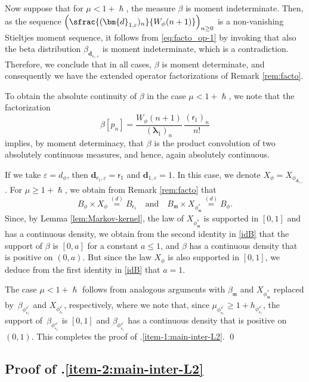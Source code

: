 \documentclass[10pt]{amsart}
\let\epsilon\varepsilon
\theoremstyle{plain}
\theoremstyle{definition}
\newcommand{\m}{\mathfrak{m}}
\newcommand{\dpt}{\bm{d}_{\vat,\epsilon}}
\newcommand{\dz}{{\bm{d}}_{1,\epsilon}}
\newcommand{\lam}{{\bm{\lambda}_1}}
\newcommand{\vat}{{\mathsf{r}_1}}
\newcommand{\phm}{{\phi_\m^*}}
\renewcommand{\varphi}{{\phi_{\vat}^{\checkmark}}}
\newcommand{\gab}[1][\lam,\mo]{{\beta_{#1}}}
\let\h\hslash
\let\mo\mu
\let\bpsi\beta
\begin{document}
Now suppose that for $\mo < 1+\h$, the measure $\bpsi$ is moment indeterminate. Then, as the sequence $\left(\sfrac{(\dz)_n}{W_{\phi}(n+1)}\right)_{n \geq 0}$ is a non-vanishing Stieltjes moment sequence, it follows from \eqref{eq:facto_op-1} by invoking \cite[Lem.\,2.2]{Berg} that also the beta distribution $\gab[\dpt]$ is moment indeterminate, which is a contradiction. Therefore, we conclude that in all cases, $\bpsi$ is moment determinate, and consequently we have the extended operator factorizations of Remark \ref{rem:facto}.

To obtain the absolute continuity of $\bpsi$ in the case $\mo < 1+\h$, we note that the factorization\vspace*{-3pt}
\[
\bpsi [p_n] = \frac{W_{\phi}(n+1)}{(\lam)_n}\,\frac{(\vat)_n}{n!}
\]
implies, by moment determinacy, that $\bpsi$ is the product convolution of two absolutely continuous measures, and hence, again absolutely continuous.

If we take $\epsilon = d_\phi$, then $\dpt = \vat$ and $\dz = 1$. In this case, we denote
$X_{\phi} = X_{\phi_{\dz}}$. For $\mo \ge 1 + \h$, we obtain from Remark \ref{rem:facto} that\vspace*{-3pt}
\begin{equation} \label{idB}
B_\phi \times X_{\phi} \stackrel{(d)}{=} B_{\vat} \quad \mbox{and} \quad
B_{\m} \times X_{\phi^*_{\m}} \stackrel{(d)}{=} B_{\phi}.
\end{equation}
Since, by Lemma \ref{lem:Markov-kernel}, the law of $X_{\phi^*_{\m}}$ is supported in $[0,1]$
and has a continuous density, we obtain from the second identity in \eqref{idB} that
the support of $\beta$ is $[0,a]$ for a constant $a \le 1$, and $\beta$ has a continuous
density that is positive on $(0,a)$. But since the law $X_{\phi}$ is also supported in $[0,1]$,
we deduce from the first identity in \eqref{idB} that $a = 1$.

The case $\mo < 1+\h$ follows from analogous arguments with $\gab[\m]$ and $X_{\phm}$ replaced by~$\bpsi_\varphi$ and $X_\varphi$, respectively, where we note that, since $\mo_\varphi \geq 1+h_\varphi$, the support of~$\bpsi_\varphi$ is $[0,1]$ and $\bpsi_\varphi$ has a continuous density that is positive on $(0,1)$. This completes the proof of .\eqref{item-1:main-inter-L2}. \qed

\subsection{Proof of .\eqref{item-2:main-inter-L2}}
\end{document}
